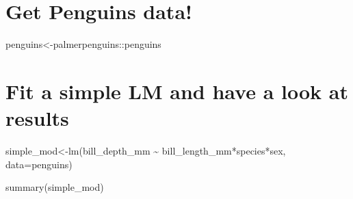 \documentclass[
  letterpaper,
  DIV=11,
  numbers=noendperiod]{scrartcl}
\newenvironment{Shaded}{\begin{snugshade}}{\end{snugshade}}
\newcommand{\AttributeTok}[1]{\textcolor[rgb]{0.40,0.45,0.13}{#1}}
\newcommand{\FunctionTok}[1]{\textcolor[rgb]{0.28,0.35,0.67}{#1}}
\newcommand{\NormalTok}[1]{\textcolor[rgb]{0.00,0.23,0.31}{#1}}
\newcommand{\OtherTok}[1]{\textcolor[rgb]{0.00,0.23,0.31}{#1}}
\newcommand{\SpecialCharTok}[1]{\textcolor[rgb]{0.37,0.37,0.37}{#1}}
\begin{document}
\hypertarget{get-penguins-data}{%
\section{Get Penguins data!}\label{get-penguins-data}}

\begin{Shaded}
\begin{Highlighting}[]
\NormalTok{penguins}\OtherTok{\textless{}{-}}\NormalTok{palmerpenguins}\SpecialCharTok{::}\NormalTok{penguins}
\end{Highlighting}
\end{Shaded}

\hypertarget{fit-a-simple-lm-and-have-a-look-at-results}{%
\section{Fit a simple LM and have a look at
results}\label{fit-a-simple-lm-and-have-a-look-at-results}}

\begin{Shaded}
\begin{Highlighting}[]
\NormalTok{simple\_mod}\OtherTok{\textless{}{-}}\FunctionTok{lm}\NormalTok{(bill\_depth\_mm }\SpecialCharTok{\textasciitilde{}}\NormalTok{ bill\_length\_mm}\SpecialCharTok{*}\NormalTok{species}\SpecialCharTok{*}\NormalTok{sex, }\AttributeTok{data=}\NormalTok{penguins)}

\FunctionTok{summary}\NormalTok{(simple\_mod)}
\end{Highlighting}
\end{Shaded}
\end{document}

